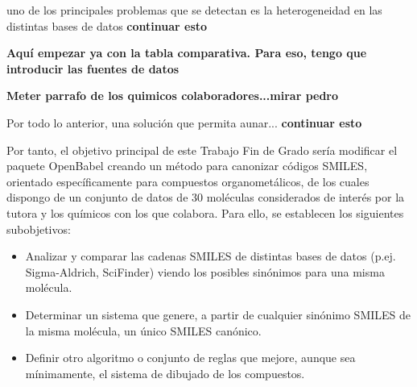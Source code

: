 uno de los principales problemas que se detectan es la heterogeneidad en las distintas bases de datos \textbf{continuar esto}



\textbf{Aquí empezar ya con la tabla comparativa. Para eso, tengo que introducir las fuentes de datos }

\noindent \textbf{Meter parrafo de los quimicos colaboradores...mirar pedro}

Por todo lo anterior, una solución que permita aunar... \textbf{continuar esto}  

Por tanto, el objetivo principal de este Trabajo Fin de Grado sería modificar el paquete OpenBabel creando un método para canonizar códigos SMILES, orientado específicamente para compuestos organometálicos, de los cuales dispongo de un conjunto de datos de 30 moléculas considerados de interés por la tutora y los químicos con los que colabora. Para ello, se establecen los siguientes subobjetivos:
\begin{itemize}
    \item Analizar y comparar las cadenas SMILES de distintas bases de datos (p.ej. Sigma-Aldrich, SciFinder) viendo los posibles sinónimos para una misma molécula.
    \item Determinar un sistema que genere, a partir de cualquier sinónimo SMILES de la misma molécula, un único SMILES canónico.
    \item Definir otro algoritmo o conjunto de reglas que mejore, aunque sea mínimamente, el sistema de dibujado de los compuestos.
\end{itemize} 




